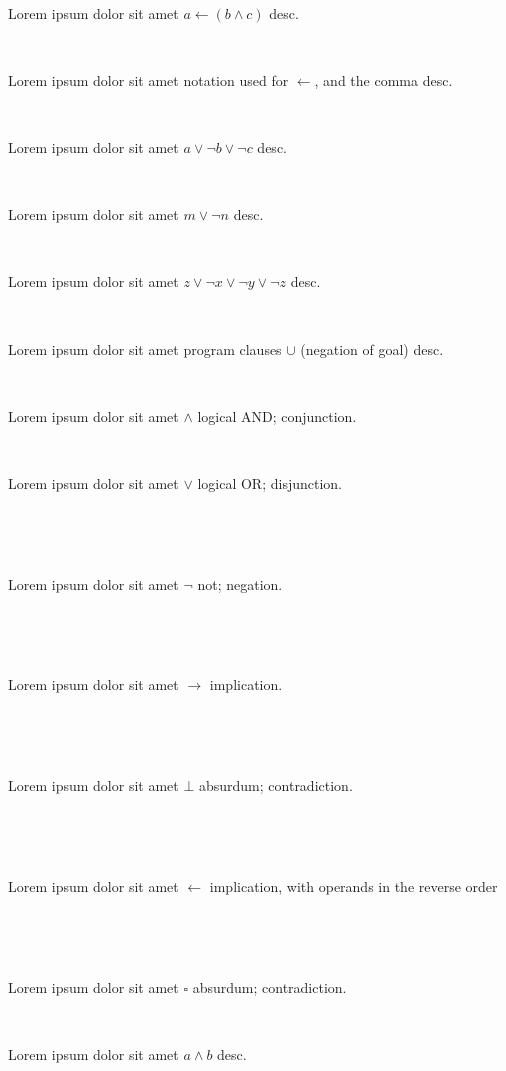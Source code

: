\documentclass[12pt]{article}
\begin{document}
\centerline{~}

Lorem ipsum dolor sit amet $ a \leftarrow ( b \wedge c ) $ desc.

\centerline{~}

Lorem ipsum dolor sit amet notation used for $ \leftarrow $, and the comma  desc.

\centerline{~}

Lorem ipsum dolor sit amet $ a \vee \neg b \vee \neg c $ desc.

\centerline{~}

Lorem ipsum dolor sit amet $ m \vee \neg n $ desc.

\centerline{~}

Lorem ipsum dolor sit amet $ z \vee \neg x \vee \neg y \vee \neg z $ desc.

\centerline{~}

Lorem ipsum dolor sit amet program clauses $ \cup $ (negation of goal) desc.


\centerline{~}

Lorem ipsum dolor sit amet $ \wedge $ logical AND; conjunction.

\centerline{~}

Lorem ipsum dolor sit amet $ \vee $ logical OR; disjunction.

\centerline{~}

\centerline{~}

Lorem ipsum dolor sit amet $ \neg $ not; negation.

\centerline{~}

\centerline{~}

Lorem ipsum dolor sit amet $ \rightarrow $ implication.

\centerline{~}

\centerline{~}

Lorem ipsum dolor sit amet $ \bot $ absurdum; contradiction.

\centerline{~}

\centerline{~}

Lorem ipsum dolor sit amet $ \leftarrow  $ implication, with operands in the reverse order

\centerline{~}

\centerline{~}

Lorem ipsum dolor sit amet $ \square $ absurdum; contradiction.

\centerline{~}


Lorem ipsum dolor sit amet $ a \wedge b $ desc.

\centerline{~}
\end{document}

